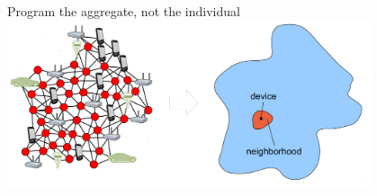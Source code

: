 \documentclass[presentation, 9pt,169]{beamer}\mode<presentation>{\usetheme{AMSBolognaFC}}
\begin{document}
\begin{frame}[plain]
\begin{center}
\Huge{}
\end{center}
\centering
\large{Program the aggregate, not the individual}
\\ \vspace{0.5cm}
\includegraphics[width=0.8\textwidth]{img/ac.png}
\end{frame}
\end{document}
